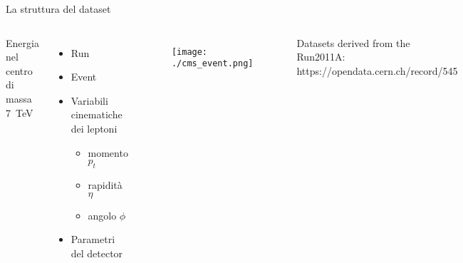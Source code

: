 \documentclass{beamer}
\begin{document}
\begin{frame}{La struttura del dataset}
  \begin{columns}
      \begin{block}{}
        \centering
        Energia nel centro di massa\linebreak
        \SI{7}{\tera\electronvolt}
        \vspace*{.3ex}
      \end{block}
      \begin{itemize}
        \item Run 
        \item Event
        \item Variabili cinematiche dei leptoni
        \begin{itemize}
          \item momento $p_t$
          \item rapidità $\eta$
          \item angolo $\phi$
        \end{itemize}
        \item Parametri del detector
      \end{itemize}

      \vspace*{6ex}
      \begin{figure}
        \centering
        \texttt{[image: ./cms\_event.png]}
      \end{figure}
%
  \begin{flushright}
    \scriptsize
    Datasets derived from the Run2011A:\\
    https://opendata.cern.ch/record/545
  \end{flushright}
  \vspace*{1ex}
  \end{columns}
\end{frame}
\end{document}

